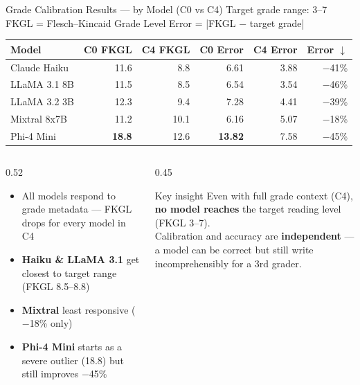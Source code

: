 \documentclass[aspectratio=169]{beamer}
\begin{document}
\begin{frame}{Grade Calibration Results --- by Model (C0 vs C4)}
\vspace{0.05cm}
{\footnotesize Target grade range: 3--7 \quad FKGL = Flesch--Kincaid Grade Level \quad Error = |FKGL $-$ target grade|}
\vspace{0.1cm}
\begin{center}
\renewcommand{\arraystretch}{1.3}
\small
\begin{tabular}{lrrrrr}
  \toprule
  \textbf{Model} & \textbf{C0 FKGL} & \textbf{C4 FKGL} & \textbf{C0 Error} & \textbf{C4 Error} & \textbf{Error $\downarrow$}\\
  \midrule
  Claude Haiku  & 11.6 & \cellcolor{custompurple!20}8.8  & 6.61 & \cellcolor{custompurple!20}3.88 & $-$41\%\\
  LLaMA 3.1 8B  & 11.5 & \cellcolor{custompurple!20}8.5  & 6.54 & \cellcolor{custompurple!20}3.54 & $-$46\%\\
  LLaMA 3.2 3B  & 12.3 & \cellcolor{custompurple!15}9.4  & 7.28 & \cellcolor{custompurple!15}4.41 & $-$39\%\\
  Mixtral 8x7B  & 11.2 & 10.1 & 6.16 & 5.07 & $-$18\%\\
  \rowcolor{darkred!8}
  Phi-4 Mini    & \textbf{18.8} & 12.6 & \textbf{13.82} & 7.58 & $-$45\%\\
  \bottomrule
\end{tabular}
\end{center}
\vspace{0.1cm}
\begin{columns}[T]
  \begin{column}{0.52\textwidth}
    \begin{itemize}\itemsep4pt\small
      \item All models respond to grade metadata --- FKGL drops for every model in C4
      \item \textbf{Haiku \& LLaMA 3.1} get closest to target range (FKGL 8.5--8.8)
      \item \textbf{Mixtral} least responsive ($-$18\% only)
      \item \textbf{Phi-4 Mini} starts as a severe outlier (18.8) but still improves $-$45\%
    \end{itemize}
  \end{column}
  \begin{column}{0.45\textwidth}
    \begin{block}{Key insight}
      \small Even with full grade context (C4), \textbf{no model reaches} the target reading level (FKGL 3--7).\\[4pt]
      Calibration and accuracy are \textbf{independent} --- a model can be correct but still write incomprehensibly for a 3rd grader.
    \end{block}
  \end{column}
\end{columns}
\end{frame}
\end{document}
